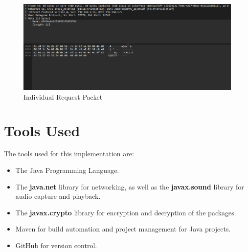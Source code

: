 \documentclass[12pt]{report}
\begin{document}
\begin{figure}[h!]
    \centering
    \includegraphics[width=1\linewidth]{Screenshot 2024-12-12 120151.png}
    \caption{Individual Request Packet}
    \label{fig:enter-label}
\end{figure}

\chapter{Tools Used}
The tools used for this implementation are:
\begin{itemize}
    \item The Java Programming Language.
    \item The \textbf{java.net} library for networking, as well as the \textbf{javax.sound} library for audio capture and playback.
    \item The \textbf{javax.crypto} library for encryption and decryption of the packages.
    \item Maven for build automation and project management for Java projects.
    \item GitHub for version control.
\end{itemize}
\end{document}
